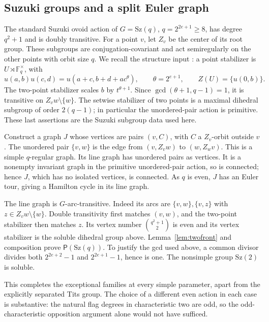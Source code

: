\documentclass[11pt]{article}
\theoremstyle{definition}
\newcommand{\F}{\mathbb F}
\newcommand{\Pp}{\mathsf P}
\newcommand{\Sz}{\mathrm{Sz}}
\begin{document}
\subsection{Suzuki groups and a split Euler graph}
The standard Suzuki ovoid action of $G=\Sz(q)$, $q=2^{2e+1}\ge8$, has degree $q^2+1$ and is doubly transitive. For a point $v$, let $Z_v$ be the center of its root group. These subgroups are conjugation-covariant and act semiregularly on the other points with orbit size $q$. We recall the structure input \cite[Section 2.2 and Table 1]{Leemans}: a point stabilizer is $U\rtimes\F_q^\times$, with
\[
u(a,b)u(c,d)=u(a+c,b+d+ac^\theta),\qquad
\theta=2^{e+1},\qquad Z(U)=\{u(0,b)\}.
\]
The two-point stabilizer scales $b$ by $t^{\theta+1}$. Since $\gcd(\theta+1,q-1)=1$, it is transitive on $Z_vw\setminus\{w\}$. The setwise stabilizer of two points is a maximal dihedral subgroup of order $2(q-1)$; in particular the unordered-pair action is primitive. These last assertions are the Suzuki subgroup data used here.

Construct a graph $J$ whose vertices are pairs $(v,C)$, with $C$ a $Z_v$-orbit outside $v$. The unordered pair $\{v,w\}$ is the edge from $(v,Z_vw)$ to $(w,Z_wv)$. This is a simple $q$-regular graph. Its line graph has unordered pairs as vertices. It is a nonempty invariant graph in the primitive unordered-pair action, so is connected; hence $J$, which has no isolated vertices, is connected. As $q$ is even, $J$ has an Euler tour, giving a Hamilton cycle in its line graph.

The line graph is $G$-arc-transitive. Indeed its arcs are $\{v,w\},\{v,z\}$ with $z\in Z_vw\setminus\{w\}$. Double transitivity first matches $(v,w)$, and the two-point stabilizer then matches $z$. Its vertex number $\binom{q^2+1}{2}$ is even and its vertex stabilizer is the soluble dihedral group above. Lemma~\ref{lem:twofront} and composition prove $\Pp(\Sz(q))$. To justify the gcd used above, a common divisor divides both $2^{2e+2}-1$ and $2^{2e+1}-1$, hence is one. The nonsimple group $\Sz(2)$ is soluble.

This completes the exceptional families at every simple parameter, apart from the explicitly separated Tits group. The choice of a different even action in each case is substantive: the natural flag degrees in characteristic two are odd, so the odd-characteristic opposition argument alone would not have sufficed.
\end{document}
